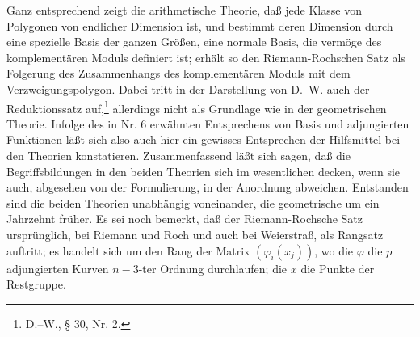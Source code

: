 \documentclass[11pt]{article}
\begin{document}
Ganz entsprechend zeigt die arithmetische Theorie, daß jede Klasse von Polygonen von endlicher Dimension ist, und bestimmt deren Dimension durch eine spezielle Basis der ganzen Größen, eine normale Basis, die vermöge des komplementären Moduls definiert ist; erhält so den Riemann-Rochschen Satz als Folgerung des Zusammenhangs des komplementären Moduls mit dem Verzweigungspolygon. Dabei tritt in der Darstellung von D.--W. auch der Reduktionssatz auf,\footnote{D.--W., § 30, Nr. 2.} allerdings nicht als Grundlage wie in der geometrischen Theorie. Infolge des in Nr. 6 erwähnten Entsprechens von Basis und adjungierten Funktionen läßt sich also auch hier ein gewisses Entsprechen der Hilfsmittel bei den Theorien konstatieren. Zusammenfassend läßt sich sagen, daß die Begriffsbildungen in den beiden Theorien sich im wesentlichen decken, wenn sie auch, abgesehen von der Formulierung, in der Anordnung abweichen. Entstanden sind die beiden Theorien unabhängig voneinander, die geometrische um ein Jahrzehnt früher. Es sei noch bemerkt, daß der Riemann-Rochsche Satz ursprünglich, bei Riemann und Roch und auch bei Weierstraß, als Rangsatz auftritt; es handelt sich um den Rang der Matrix \((\varphi_i(x_j))\), wo die \(\varphi\) die \(p\) adjungierten Kurven \(n-3\)-ter Ordnung durchlaufen; die \(x\) die Punkte der Restgruppe.
\end{document}
